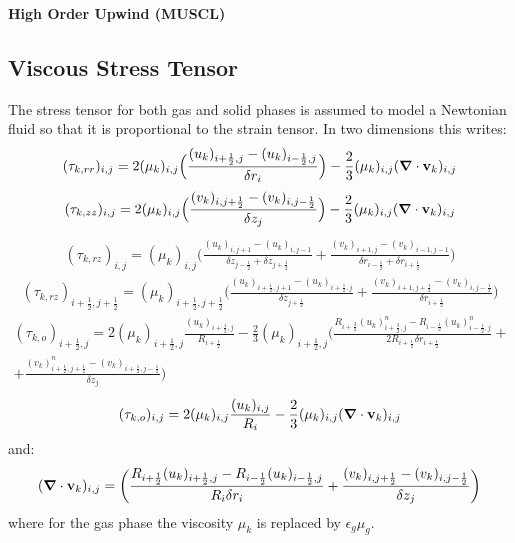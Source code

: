 {\bf High Order Upwind (MUSCL)}
%
\subsection{Viscous Stress Tensor}

The stress tensor for both gas and solid phases is assumed to model a Newtonian fluid
so that it is proportional to the strain tensor. In two dimensions this writes:\\

\begin{eqnarray}
(\tau_{k,rr})_{i,j} = 2 (\mu_k)_{i,j} 
\Big( \frac{(u_k)_{i+\frac{1}{2},j} - (u_k)_{i-\frac{1}{2},j}}
{\delta r_{i}} \Big ) - \frac{2}{3} (\mu_k)_{i,j} 
(\mbox{\boldmath $\nabla$} \cdot {\bf v}_k)_{i,j}
\nonumber
\end{eqnarray}
%
\begin{eqnarray}
(\tau_{k,zz})_{i,j} = 2 (\mu_k)_{i,j} 
\Big( \frac{(v_k)_{i,j+\frac{1}{2}} -(v_k)_{i,j-\frac{1}{2}}}
{\delta z_{j}} \Big ) - \frac{2}{3} (\mu_k)_{i,j} 
(\mbox{\boldmath $\nabla$} \cdot {\bf v}_k)_{i,j}
\nonumber
\end{eqnarray}
%
\begin{eqnarray}
(\tau_{k,rz})_{i,j} = (\mu_k)_{i,j} \Big( \frac{(u_k)_{i,j+1} -(u_k)_{i,j-1}}
{\delta z_{j-\frac{1}{2}}+\delta z_{j+\frac{1}{2}}} +
\frac{(v_k)_{i+1,j} -(v_k)_{i-1,j-1}}
{\delta r_{i-\frac{1}{2}}+\delta r_{i+\frac{1}{2}}} \Big)
\nonumber
\end{eqnarray}
%
\begin{eqnarray}
(\tau_{k,rz})_{i+\frac{1}{2},j+\frac{1}{2}} = (\mu_k)_{i+\frac{1}{2},j+\frac{1}{2}} 
\Big( \frac{(u_k)_{i+\frac{1}{2},j+1} -(u_k)_{i+\frac{1}{2},j}}
{\delta z_{j+\frac{1}{2}}} +
\frac{(v_k)_{i+1,j+\frac{1}{2}} -(v_k)_{i,j-\frac{1}{2}}}
{\delta r_{i+\frac{1}{2}}} \Big )
\nonumber
\end{eqnarray}
%
\begin{eqnarray}
(\tau_{k,o})_{i+\frac{1}{2},j} = 2 (\mu_k)_{i+\frac{1}{2},j} 
\frac{(u_k)_{i+\frac{1}{2},j}}
{R_{i+\frac{1}{2}}} -
\frac{2}{3} (\mu_k)_{i+\frac{1}{2},j}
\Bigg( \frac{R_{i+\frac{3}{2}} (u_k)_{i+\frac{3}{2},j}^{n} - 
R_{i-\frac{1}{2}} (u_k)_{i-\frac{1}{2},j}^{n}}
{2 R_{i+\frac{1}{2}} \delta r_{i+\frac{1}{2}}} + \nonumber \\
+ \frac{(v_k)_{i+\frac{1}{2},j+\frac{1}{2}}^{n} - 
(v_k)_{i+\frac{1}{2},j-\frac{1}{2}}}
{\delta z_{j}} \Bigg)
\nonumber
\end{eqnarray}
%
\begin{eqnarray}
(\tau_{k,o})_{i,j} = 2 (\mu_k)_{i,j} \frac{(u_k)_{i,j}}
{R_{i}} - \frac{2}{3} (\mu_k)_{i,j} (\mbox{\boldmath $\nabla$} 
\cdot {\bf v}_k)_{i,j}
\nonumber
\end{eqnarray}
%
and:
%
\begin{eqnarray}
(\mbox{\boldmath $\nabla$} \cdot {\bf v}_{k})_{i,j} = 
\bigg( \frac{R_{i+\frac{1}{2}} (u_k)_{i+\frac{1}{2},j} - 
R_{i-\frac{1}{2}} (u_k)_{i-\frac{1}{2},j}} {R_{i} \delta r_{i}} + 
\frac{(v_k)_{i,j+\frac{1}{2}} - (v_k)_{i,j-\frac{1}{2}}} {\delta z_{j}} \bigg)
\nonumber
\end{eqnarray}
%
where for the gas phase the viscosity $\mu_k$ is replaced 
by $\epsilon_g \mu_g$.\\[3mm]
%
\newpage
